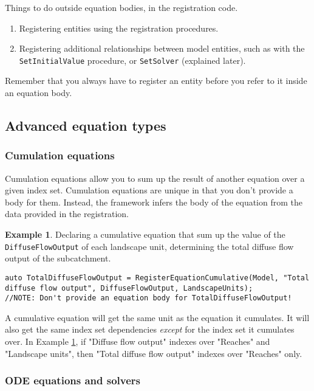 \documentclass[11pt]{article}
\theoremstyle{definition}
\newtheorem{myexample}{Example}
\newenvironment{example}%
  {\begin{lrbox}{\examplebox}%
   \begin{minipage}{\dimexpr\linewidth-2\fboxsep}
   \begin{myexample}}%
  {\end{myexample}%
   \end{minipage}%
   \end{lrbox}%
   \begin{trivlist}
     \item[]\colorbox{silver}{\usebox\examplebox}
   \end{trivlist}}
\begin{document}
Things to do outside equation bodies, in the registration code.
\begin{enumerate}[i]
\item Registering entities using the registration procedures.
\item Registering additional relationships between model entities, such as with the {\tt SetInitialValue} procedure, or {\tt SetSolver} (explained later).
\end{enumerate}

Remember that you always have to register an entity before you refer to it inside an equation body.

\subsection{Advanced equation types}

\subsubsection{Cumulation equations}

Cumulation equations allow you to sum up the result of another equation over a given index set. Cumulation equations are unique in that you don't provide a body for them. Instead, the framework infers the body of the equation from the data provided in the registration.

\begin{example}\label{ex:cumulation}
Declaring a cumulative equation that sum up the value of the {\tt DiffuseFlowOutput} of each landscape unit, determining the total diffuse flow output of the subcatchment.
\begin{lstlisting}[style=mycpp]
auto TotalDiffuseFlowOutput = RegisterEquationCumulative(Model, "Total diffuse flow output", DiffuseFlowOutput, LandscapeUnits);
//NOTE: Don't provide an equation body for TotalDiffuseFlowOutput!
\end{lstlisting}
\end{example}

A cumulative equation will get the same unit as the equation it cumulates. It will also get the same index set dependencies \emph{except} for the index set it cumulates over. In Example \ref{ex:cumulation}, if "Diffuse flow output" indexes over "Reaches" and "Landscape units", then "Total diffuse flow output" indexes over "Reaches" only.

\subsubsection{ODE equations and solvers}
\end{document}
